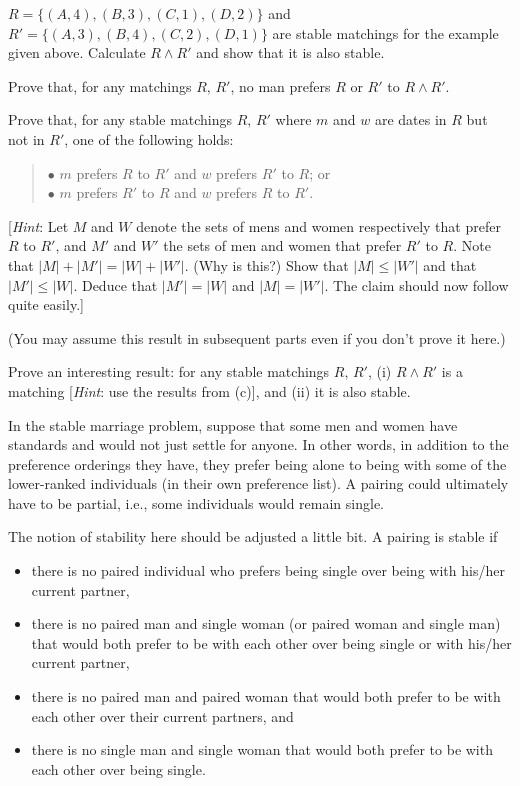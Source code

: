 \begin{Parts}
\Part $R=\{(A,4),(B,3),(C,1),(D,2)\}$ and
$R'=\{(A,3),(B,4),(C,2),(D,1)\}$ are stable matchings for the
example given above. Calculate $R \land R'$
and show that it is also stable.

\Part Prove that, for any matchings $R,\,R'$,
no man prefers $R$ or $R'$ to $R \land R'$.

\Part  Prove that, for any stable matchings $R,\,R'$
where $m$ and $w$ are dates in $R$ but not in $R'$, one of the following
holds:
\begin{quote}
$\bullet$ $m$ prefers $R$ to $R'$ and $w$ prefers $R'$ to $R$; or\\
$\bullet$ $m$ prefers $R'$ to $R$ and $w$ prefers $R$ to $R'$.
\end{quote}
[\textit{Hint}: Let $M$ and $W$ denote the sets of mens and women respectively
that prefer $R$ to $R'$, and $M'$ and $W'$ the sets of men and women that prefer $R'$ to $R$.  Note that $|M|+|M'|=|W|+|W'|$. (Why is this?) Show that $|M| \leq |W'|$ and that $|M'| \leq |W|$.  Deduce that $|M'|=|W|$ and $|M|=|W'|$.  The claim should now follow quite easily.]

(You may assume this result in subsequent parts even if you don't prove it here.)

\Part Prove an interesting result: for any stable matchings $R,\,R'$, (i) $R \land R'$ is a matching [\textit{Hint}: use the results from (c)], and (ii) it is also stable.

\end{Parts}



In the stable marriage problem, suppose that some men and women have standards and would not just settle
for anyone. In other words, in addition to the preference orderings they have,
they prefer being alone to being with some of the lower-ranked individuals
(in their own preference list). A pairing could ultimately have to be partial, i.e., some individuals would
remain single.

The notion of stability here should
be adjusted a little bit. A pairing is stable if
\begin{itemize}
\item there is no paired individual who prefers being single over being with his/her current partner,
\item there is no paired man and single woman (or paired woman and single man) that would both prefer to be with each other over being single or with his/her current partner,
\item there is no paired man and paired woman that would both prefer to be with each other over their current partners, and
\item there is no single man and single woman that would both prefer to be with each other over being single. 
\end{itemize} 

